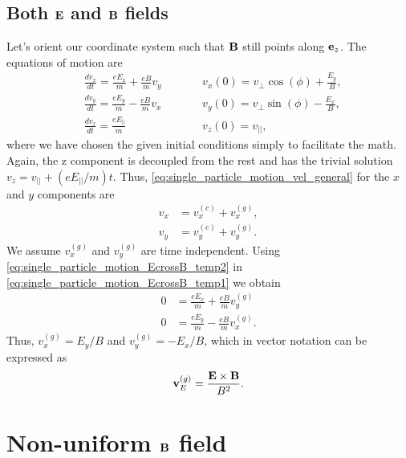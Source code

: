 \documentclass[oneside,a4paper,11pt]{report}
\begin{document}
\subsection{Both $\mathbf{E}$ and $\mathbf{B}$ fields}
\label{sec:E_and_B_field}
Let's orient our coordinate system such that $\mathbf{B}$ still points along $\mathbf{e}_z$. The equations of motion are
\begin{subequations}
\label{eq:single_particle_motion_EcrossB_temp1}
\begin{alignat}{2}
    &\frac{d v_x}{dt} = \frac{eE_x}{m} + \frac{eB}{m} v_y  \qquad && v_x(0) = v_\perp \cos(\phi) + \frac{E_y}{B}, \label{eq:E_and_B_1} \\
    &\frac{d v_y}{dt} = \frac{eE_y}{m} - \frac{eB}{m} v_x  \qquad && v_y(0) = v_\perp \sin(\phi) - \frac{E_x}{B}, \label{eq:E_and_B_2} \\
    &\frac{d v_z}{dt} = \frac{e E_{||}}{m}  \qquad && v_z(0) = v_{||}, \label{eq:E_and_B_3}
\end{alignat}
\end{subequations}
where we have chosen the given initial conditions simply to facilitate the math. Again, the z component is decoupled from the rest and has the trivial solution $v_z = v_{||} +  (eE_{||}/m) t$. Thus, \cref{eq:single_particle_motion_vel_general} for the $x$ and $y$ components are
\begin{align}
    \label{eq:single_particle_motion_EcrossB_temp2}
    v_x &= v_x^{(c)} + v^{(g)}_x, \nonumber \\
    v_y &= v_y^{(c)} + v^{(g)}_y.
\end{align}
We assume $v^{(g)}_x$ and $v^{(g)}_y$ are time independent. Using \cref{eq:single_particle_motion_EcrossB_temp2} in \cref{eq:single_particle_motion_EcrossB_temp1} we obtain
\begin{align}
    0 &= \frac{eE_x}{m} + \frac{eB}{m}v^{(g)}_y \nonumber \\
    0 &= \frac{eE_y}{m} - \frac{eB}{m}v^{(g)}_x.
\end{align}
Thus, $v^{(g)}_x = E_y/B$ and $v^{(g)}_y = -E_x/B$, which in vector notation can be expressed as
\begin{equation}
    \mathbf{v}^{(g)}_E = \frac{\mathbf{E} \times \mathbf{B}}{B^2}.
\end{equation}

\section{Non-uniform $\mathbf{B}$ field}
\end{document}
